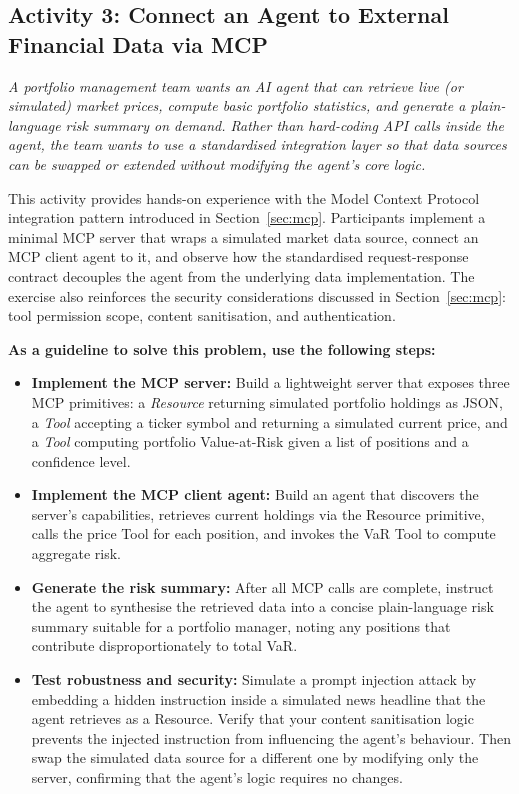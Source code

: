 \documentclass{article}
\begin{document}

\subsection*{Activity 3: Connect an Agent to External Financial Data via MCP}
\textit{
A portfolio management team wants an AI agent that can retrieve live (or simulated) market prices, compute basic portfolio statistics, and generate a plain-language risk summary on demand. Rather than hard-coding API calls inside the agent, the team wants to use a standardised integration layer so that data sources can be swapped or extended without modifying the agent's core logic.
}

This activity provides hands-on experience with the Model Context Protocol integration pattern introduced in Section~\ref{sec:mcp}. Participants implement a minimal MCP server that wraps a simulated market data source, connect an MCP client agent to it, and observe how the standardised request-response contract decouples the agent from the underlying data implementation. The exercise also reinforces the security considerations discussed in Section~\ref{sec:mcp}: tool permission scope, content sanitisation, and authentication.

\textbf{As a guideline to solve this problem, use the following steps:}
\begin{itemize}
    \item \textbf{Implement the MCP server:} Build a lightweight server that exposes three MCP primitives: a \textit{Resource} returning simulated portfolio holdings as JSON, a \textit{Tool} accepting a ticker symbol and returning a simulated current price, and a \textit{Tool} computing portfolio Value-at-Risk given a list of positions and a confidence level.
    \item \textbf{Implement the MCP client agent:} Build an agent that discovers the server's capabilities, retrieves current holdings via the Resource primitive, calls the price Tool for each position, and invokes the VaR Tool to compute aggregate risk.
    \item \textbf{Generate the risk summary:} After all MCP calls are complete, instruct the agent to synthesise the retrieved data into a concise plain-language risk summary suitable for a portfolio manager, noting any positions that contribute disproportionately to total VaR.
    \item \textbf{Test robustness and security:} Simulate a prompt injection attack by embedding a hidden instruction inside a simulated news headline that the agent retrieves as a Resource. Verify that your content sanitisation logic prevents the injected instruction from influencing the agent's behaviour. Then swap the simulated data source for a different one by modifying only the server, confirming that the agent's logic requires no changes.
\end{itemize}
\end{document}
